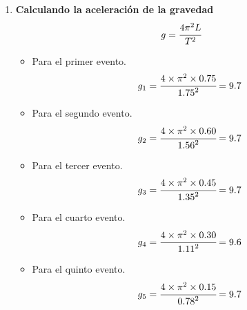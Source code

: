 \begin{enumerate}[label=\bfseries\alph*.-,itemsep=2pt]
	\item \textbf{Calculando la aceleración de la gravedad}
	      \[g= \cfrac{4\pi^2L}{T^2}\]
	      \begin{itemize}[label=\textbf{$\bullet$},itemsep=2pt,partopsep=6pt,parsep=6pt]
		      \item Para el primer evento.
		            \[g_1= \cfrac{4\times\pi^2\times{0.75}}{{1.75}^2}=9.7\]
		      \item Para el segundo evento.
		            \[g_2= \cfrac{4\times\pi^2\times{0.60}}{{1.56}^2}=9.7\]
		      \item Para el tercer evento.
		            \[g_3= \cfrac{4\times\pi^2\times{0.45}}{{1.35}^2}=9.7\]
		      \item Para el cuarto evento.
		            \[g_4= \cfrac{4\times\pi^2\times{0.30}}{{1.11}^2}=9.6\]
		      \item Para el quinto evento.
		            \[g_5= \cfrac{4\times\pi^2\times{0.15}}{{0.78}^2}=9.7\]
	      \end{itemize}
\end{enumerate}

